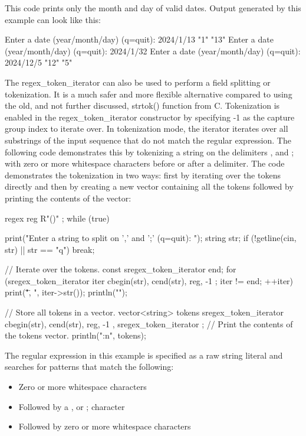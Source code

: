 This code prints only the month and day of valid dates. Output generated by this example can look like this:

\begin{shell}
Enter a date (year/month/day) (q=quit): 2024/1/13
"1"
"13"
Enter a date (year/month/day) (q=quit): 2024/1/32
Enter a date (year/month/day) (q=quit): 2024/12/5
"12"
"5"
\end{shell}

The regex\_token\_iterator can also be used to perform a field splitting or tokenization. It is a much safer and more flexible alternative compared to using the old, and not further discussed, strtok() function from C. Tokenization is enabled in the regex\_token\_iterator constructor by specifying -1 as the capture group index to iterate over. In tokenization mode, the iterator iterates over all substrings of the input sequence that do not match the regular expression. The following code demonstrates this by tokenizing a string on the delimiters , and ; with zero or more whitespace characters before or after a delimiter. The code demonstrates the tokenization in two ways: first by iterating over the tokens directly and then by creating a new vector containing all the tokens followed by printing the contents of the vector:

\begin{cpp}
regex reg { R"(\s*[,;]\s*)" };
while (true) {
    print("Enter a string to split on ',' and ';' (q=quit): ");
    string str;
    if (!getline(cin, str) || str == "q") { break; }

    // Iterate over the tokens.
    const sregex_token_iterator end;
    for (sregex_token_iterator iter { cbegin(str), cend(str), reg, -1 };
    iter != end; ++iter) {
        print("\"{}\", ", iter->str());
    }
    println("");

    // Store all tokens in a vector.
    vector<string> tokens {
        sregex_token_iterator { cbegin(str), cend(str), reg, -1 },
        sregex_token_iterator {} };
    // Print the contents of the tokens vector.
    println("{:n}", tokens);
}
\end{cpp}

The regular expression in this example is specified as a raw string literal and searches for patterns that match the following:

\begin{itemize}
\item
Zero or more whitespace characters

\item
Followed by a , or ; character

\item
Followed by zero or more whitespace characters
\end{itemize}

